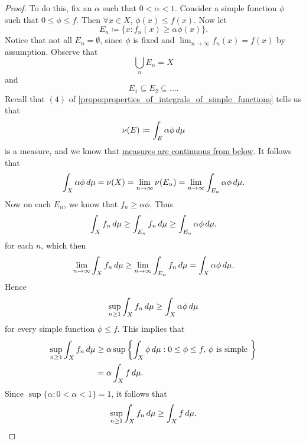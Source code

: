 \documentclass[notoc,notitlepage]{tufte-book}
\begin{document}
\begin{proof}
  To do this, fix an $\alpha$ such that $0 < \alpha < 1$.
  Consider a simple function $\phi$ such that
  $0 \leq \phi \leq f$. Then $\forall x \in X$,
  $\phi(x) \leq f(x)$.
  Now let
  \begin{equation*}
    E_n \coloneqq \{ x : f_n(x) \geq \alpha \phi(x) \}.
  \end{equation*}
  Notice that not all $E_n = \emptyset$, since $\phi$ is fixed
  and $\lim_{n \to \infty} f_n(x) = f(x)$ by assumption.
  Observe that
  \begin{equation*}
    \bigcup_{n} E_n = X
  \end{equation*}
  and
  \begin{equation*}
    E_1 \subseteq E_2 \subseteq \hdots.
  \end{equation*}
  Recall that $(4)$ of \cref{propo:properties_of_integrals_of_simple_functions}
  tells us that
  \begin{equation*}
    \nu(E) \coloneqq \int_{E} \alpha \phi \mathop{}\!d{\mu}
  \end{equation*}
  is a measure, and we know that
  \hyperref[thm:properties_of_a_measure]{measures are continuous from below}.
  It follows that
  \begin{align*}
    \int_{X} \alpha \phi \mathop{}\!d{\mu} = \nu(X) = \lim_{n \to \infty} \nu(E_n)
    = \lim_{n \to \infty} \int_{E_n} \alpha \phi \mathop{}\!d{\mu}.
  \end{align*}
  Now on each $E_n$, we know that $f_n \geq \alpha \phi$.
  Thus
  \begin{equation*}
    \int_{X} f_n \mathop{}\!d{\mu} \geq \int_{E_n} f_n \mathop{}\!d{\mu}
               \geq \int_{E_n} \alpha\phi \mathop{}\!d{\mu},
  \end{equation*}
  for each $n$, which then
  \begin{equation*}
    \lim_{n \to \infty} \int_{X} f_n \mathop{}\!d{\mu}
    \geq \lim_{n \to \infty} \int_{E_n} f_n \mathop{}\!d{\mu}
    = \int_{X} \alpha\phi \mathop{}\!d{\mu}.
  \end{equation*}
  Hence
  \begin{equation*}
    \sup_{n \geq 1} \int_{X} f_n \mathop{}\!d{\mu}
    \geq \int_{X} \alpha\phi \mathop{}\!d{\mu}
  \end{equation*}
  for every simple function $\phi \leq f$.
  This implies that
  \begin{align*}
    \sup_{n \geq 1} \int_{X} f_n \mathop{}\!d{\mu}
    &\geq \alpha \sup \left\{ \int_{X} \phi \mathop{}\!d{\mu}
      : 0 \leq \phi \leq f,\, \phi \text{ is simple } \right\} \\
    &= \alpha \int_{X} f \mathop{}\!d{\mu}.
  \end{align*}
  Since $\sup \{ \alpha : 0 < \alpha < 1 \} = 1$, it follows that
  \begin{equation*}
    \sup_{n \geq 1} \int_{X} f_n \mathop{}\!d{\mu} \geq \int_{X} f \mathop{}\!d{\mu}.
  \end{equation*}
\end{proof}
\end{document}
